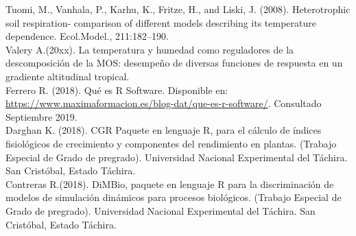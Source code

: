 \noindent
Tuomi, M., Vanhala, P., Karhu, K., Fritze, H., and Liski, J. (2008). Heterotrophic soil respiration- comparison of different models describing its temperature dependence. Ecol.Model., 211:182–190.\\

\noindent
Valery A.(20xx). La temperatura y humedad como reguladores de la descomposici\'on de la MOS: desempeño de diversas funciones de respuesta en un gradiente altitudinal tropical.\\

\noindent
Ferrero R. (2018). Qu\'e es R Software. Disponible en: \url{https://www.maximaformacion.es/blog-dat/que-es-r-software/}. Consultado Septiembre 2019.\\

\noindent
Darghan K. (2018). CGR Paquete en lenguaje R, para el c\'alculo de índices fisiol\'ogicos de crecimiento y componentes del rendimiento en plantas. (Trabajo Especial de Grado de pregrado). Universidad Nacional Experimental del T\'achira. San Crist\'obal, Estado T\'achira.\\

\noindent
Contreras R.(2018). DiMBio, paquete en lenguaje R para la discriminaci\'on de modelos de simulaci\'on din\'amicos para procesos biol\'ogicos. (Trabajo Especial de Grado de pregrado). Universidad Nacional Experimental del T\'achira. San Crist\'obal, Estado T\'achira.\\
